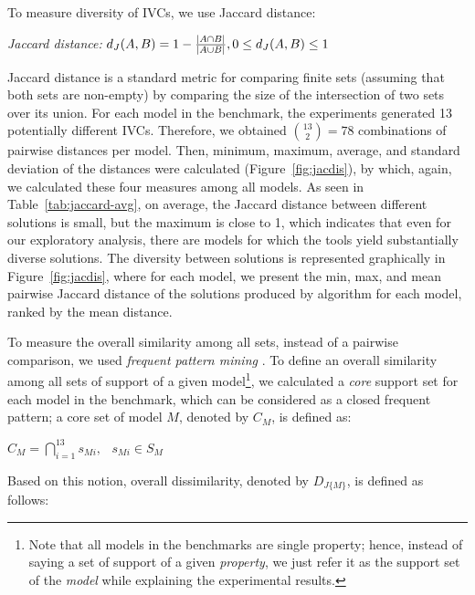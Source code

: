 To measure diversity of IVCs, we use Jaccard distance:
\begin{definition}{\emph{Jaccard distance:}}
  \label{def:dj}
  $d_J(\small{A}, \small{B}) = 1 - \frac{|A \cap B|}{|A \cup B|} ,\\ 0 \leq d_J(\small{A}, \small{B}) \leq 1$
\end{definition}
\noindent Jaccard distance is a standard metric for comparing finite
sets (assuming that both sets are non-empty) by comparing the size of
the intersection of two sets over its union. For each model in the
benchmark, the experiments generated 13 potentially different IVCs. Therefore, we
obtained $\binom{13}{2} = 78$ combinations of pairwise distances per
model. Then, minimum, maximum, average, and standard deviation of the
distances were calculated (Figure~\ref{fig:jacdis}), by which, again,
we calculated these four measures among all models. As seen in
Table~\ref{tab:jaccard-avg}, on average, the Jaccard distance between
different solutions is small, but the maximum is close to 1, which
indicates that even for our exploratory analysis, there are models for
which the tools yield substantially diverse solutions. The diversity
between solutions is represented graphically in
Figure~\ref{fig:jacdis}, where for each model, we present the min,
max, and mean pairwise Jaccard distance of the solutions produced by algorithm
\ucalg for each model, ranked by the mean distance.

\iffalse
{}

To measure the overall similarity among all sets, instead of a pairwise comparison, we used \emph{frequent pattern mining} \cite{han2007frequent}. To define an overall similarity among all sets of support of a given model\footnote{Note that all models in the benchmarks are single property; hence, instead of saying a set of support of a given \emph{property}, we just refer it as the support set of the \emph{model} while explaining the experimental results.}, we calculated a \emph{core} support set for each model in the benchmark, which can be considered as a closed frequent pattern; a core set of model $M$, denoted by $C_M$, is defined as:
\begin{definition}
  \label{def:core}
  $C_M = \bigcap_{i=1}^{13} s_{Mi},   \hspace{9pt} s_{Mi} \in S_M$
\end{definition}

Based on this notion, overall dissimilarity, denoted by $D_{J\{M\}}$, is defined as follows:

